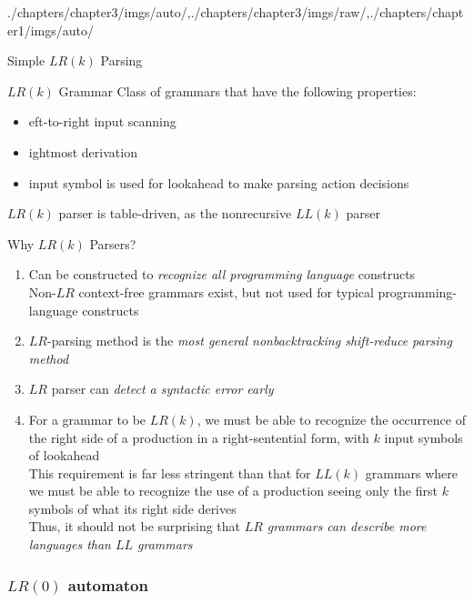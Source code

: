 \begin{graphicspathcontext}{{./chapters/chapter3/imgs/auto/},{./chapters/chapter3/imgs/raw/},{./chapters/chapter1/imgs/auto/}}
\begin{bibunit}[apalike]
\begin{frame}{Simple $LR(k)$ Parsing}
	\vspace{.5cm}
	\begin{definitionblock}{$LR(k)$ Grammar}
		Class of grammars that have the following properties:
		\begin{itemize}
			\item {\Large{}}eft-to-right input scanning
			\item {\Large{}}ightmost derivation
			\item {\Large{}} input symbol is used for lookahead to make parsing action decisions
		\end{itemize}
		$LR(k)$ parser is table-driven, as the nonrecursive $LL(k)$ parser
	\end{definitionblock}
	\vspace{.5cm}
\end{frame}

\begin{frame}{Why $LR(k)$ Parsers?}
	\begin{enumerate}
	\item Can be constructed to \emph{recognize all programming language} constructs \\
		Non-$LR$ context-free grammars exist, but not used for typical programming-language constructs
	\item $LR$-parsing method is the \emph{most general nonbacktracking shift-reduce parsing method}
	\item $LR$ parser can \emph{detect a syntactic error early}
	\item For a grammar to be $LR(k)$, we must be able to recognize the occurrence of the right side of a production in a right-sentential form, with $k$ input symbols of lookahead \\
		This requirement is far less stringent than that for $LL(k)$ grammars where we must be able to recognize the use of a production seeing only the first $k$ symbols of what its right side derives \\
		Thus, it should not be surprising that \emph{$LR$ grammars can describe more languages than $LL$ grammars}
	\end{enumerate}
\end{frame}

\subsubsection{$LR(0)$ automaton}
\subsubsectiontableofcontentslide


\end{bibunit}
\end{graphicspathcontext}
